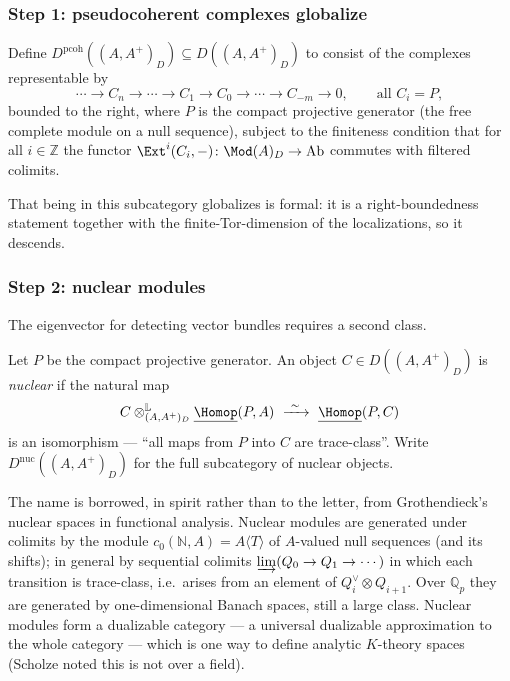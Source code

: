 \subsubsection*{Step 1: pseudocoherent complexes globalize}

\begin{definition}
\label{def:10:solid-pcoh}
Define $D^{\mathrm{pcoh}}((A,A^{+})_{D})\subseteq D((A,A^{+})_{D})$ to consist of
the complexes representable by
\begin{equation*}
\cdots\to C_{n}\to\cdots\to C_{1}\to C_{0}\to\cdots\to C_{-m}\to 0,\qquad
\text{all } C_{i}=P,
\end{equation*}
bounded to the right, where $P$ is the compact projective generator (the free
complete module on a null sequence), subject to the finiteness condition that for
all $i\in\mathbb{Z}$ the functor $\Ext^{i}(C_{i},-)\colon\Mod(A)_{D}\to\mathrm{Ab}$
commutes with filtered colimits.
\end{definition}

That being in this subcategory globalizes is formal: it is a right-boundedness
statement together with the finite-Tor-dimension of the localizations, so it
descends.

\subsubsection*{Step 2: nuclear modules}

The eigenvector for detecting vector bundles requires a second class.

\begin{definition}
\label{def:10:nuclear}
Let $P$ be the compact projective generator. An object
$C\in D((A,A^{+})_{D})$ is \emph{nuclear} if the natural map
\begin{equation}
\label{eq:10:nuclear}
C\otimes^{\mathbb{L}}_{(A,A^{+})_{D}}\underline{\Homop}(P,A)\
\xrightarrow{\ \sim\ }\ \underline{\Homop}(P,C)
\end{equation}
is an isomorphism --- ``all maps from $P$ into $C$ are trace-class''. Write
$D^{\mathrm{nuc}}((A,A^{+})_{D})$ for the full subcategory of nuclear objects.
\end{definition}

\begin{remark}
\label{rmk:10:nuclear-remarks}
The name is borrowed, in spirit rather than to the letter, from Grothendieck's
nuclear spaces in functional analysis. Nuclear modules are generated under
colimits by the module $c_{0}(\mathbb{N},A)=A\langle T\rangle$ of $A$-valued null
sequences (and its shifts); in general by sequential colimits
$\varinjlim(Q_{0}\to Q_{1}\to\cdots)$ in which each transition is trace-class,
i.e.\ arises from an element of $Q_{i}^{\vee}\otimes Q_{i+1}$. Over $\mathbb{Q}_p$
they are generated by one-dimensional Banach spaces, still a large class. Nuclear
modules form a dualizable category --- a universal dualizable approximation to the
whole category --- which is one way to define analytic $K$-theory spaces
(Scholze noted this is not over a field).
\end{remark}

